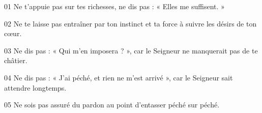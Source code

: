 01 Ne t’appuie pas sur tes richesses, ne dis pas : « Elles me suffisent. »

02 Ne te laisse pas entraîner par ton instinct et ta force à suivre les désirs de ton cœur.

03 Ne dis pas : « Qui m’en imposera ? », car le Seigneur ne manquerait pas de te châtier.

04 Ne dis pas : « J’ai péché, et rien ne m’est arrivé », car le Seigneur sait attendre longtemps.

05 Ne sois pas assuré du pardon au point d’entasser péché sur péché.

